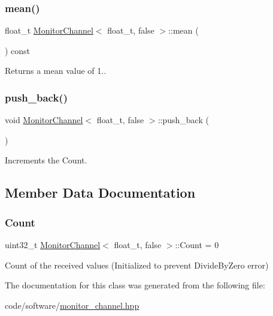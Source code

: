 \subsubsection{\texorpdfstring{mean()}{mean()}}
{\footnotesize\ttfamily float\+\_\+t \hyperlink{classMonitorChannel}{Monitor\+Channel}$<$ float\+\_\+t, false $>$\+::mean (\begin{DoxyParamCaption}{ }\end{DoxyParamCaption}) const\hspace{0.3cm}{\ttfamily [inline]}}

Returns a mean value of 1.. \mbox{\label{classMonitorChannel_3_01float__t_00_01false_01_4_acf06bae19966139c299c87d3ce215fd1}} 
\subsubsection{\texorpdfstring{push\+\_\+back()}{push\_back()}}
{\footnotesize\ttfamily void \hyperlink{classMonitorChannel}{Monitor\+Channel}$<$ float\+\_\+t, false $>$\+::push\+\_\+back (\begin{DoxyParamCaption}{ }\end{DoxyParamCaption})\hspace{0.3cm}{\ttfamily [inline]}}

Increments the {\ttfamily Count}. 

\subsection{Member Data Documentation}
\mbox{\label{classMonitorChannel_3_01float__t_00_01false_01_4_ab79a9dadb04efa6fbc7db0d89b9affb5}} 
\subsubsection{\texorpdfstring{Count}{Count}}
{\footnotesize\ttfamily uint32\+\_\+t \hyperlink{classMonitorChannel}{Monitor\+Channel}$<$ float\+\_\+t, false $>$\+::Count = 0}



Count of the received values (Initialized to prevent Divide\+By\+Zero error) 



The documentation for this class was generated from the following file\+:\begin{DoxyCompactItemize}
\item 
code/software/\hyperlink{monitor__channel_8hpp}{monitor\+\_\+channel.\+hpp}\end{DoxyCompactItemize}
